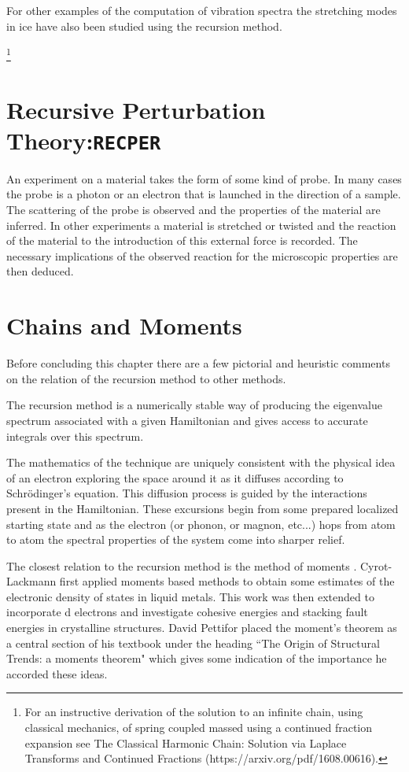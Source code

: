 For other examples of the computation of vibration spectra the stretching modes 
in ice have also been studied using the recursion method\cite{mcgra78,bergren82}.

\footnote{For an instructive derivation of the solution to an infinite 
chain, using classical mechanics, of spring coupled massed using a continued fraction expansion see 
The Classical Harmonic Chain: Solution via Laplace Transforms and Continued Fractions 
(https://arxiv.org/pdf/1608.00616).}

\section{Recursive Perturbation Theory:\texttt{RECPER}}
An experiment on a material takes the form of some kind of probe. In many cases the probe is
a photon or an electron that is launched in the direction of a sample. The scattering 
of the probe is observed and the properties of the material are inferred.
In other experiments a material is stretched or twisted and the 
reaction of the material to the introduction of this external
force is recorded. The necessary implications of the observed reaction
for the microscopic properties are then deduced.

\section{Chains and Moments}
Before concluding this chapter there are a few 
pictorial and heuristic comments on the relation of 
the recursion method to other methods.

The recursion method is a numerically stable way of producing 
the eigenvalue spectrum associated with a given Hamiltonian and 
gives access to accurate integrals over this spectrum. 

The mathematics of the technique are uniquely consistent
with the physical idea of an electron exploring
the space around it as it diffuses according to Schr\"odinger's
equation. This diffusion process is guided by the interactions present in the Hamiltonian.
These excursions begin from some prepared localized starting state
and as the electron (or phonon, or magnon, etc...) hops from atom to atom
the spectral properties of the system come into sharper relief.

The closest relation to the recursion method is the method of moments
\cite{cyrotlackmann67, ducastelle70,ducastelle71}. Cyrot-Lackmann first applied
moments based methods to obtain some estimates of the electronic density of
states in liquid metals\cite{cyrotlackmann67}. This work was then extended
to incorporate d electrons and investigate cohesive energies and stacking
fault energies in crystalline structures. David Pettifor placed the moment's 
theorem as a central section of his textbook\cite{pettifor94} under the heading
``The Origin of Structural Trends: a moments theorem" which gives some indication
of the importance he accorded these ideas.

